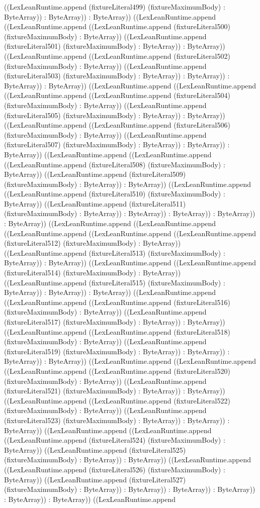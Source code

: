\documentclass[11pt]{article}
\begin{document}
((LexLeanRuntime.append (fixtureLiteral499) (fixtureMaximumBody) : ByteArray)) : ByteArray)) : ByteArray)) ((LexLeanRuntime.append ((LexLeanRuntime.append ((LexLeanRuntime.append (fixtureLiteral500) (fixtureMaximumBody) : ByteArray)) ((LexLeanRuntime.append (fixtureLiteral501) (fixtureMaximumBody) : ByteArray)) : ByteArray)) ((LexLeanRuntime.append ((LexLeanRuntime.append (fixtureLiteral502) (fixtureMaximumBody) : ByteArray)) ((LexLeanRuntime.append (fixtureLiteral503) (fixtureMaximumBody) : ByteArray)) : ByteArray)) : ByteArray)) : ByteArray)) ((LexLeanRuntime.append ((LexLeanRuntime.append ((LexLeanRuntime.append ((LexLeanRuntime.append (fixtureLiteral504) (fixtureMaximumBody) : ByteArray)) ((LexLeanRuntime.append (fixtureLiteral505) (fixtureMaximumBody) : ByteArray)) : ByteArray)) ((LexLeanRuntime.append ((LexLeanRuntime.append (fixtureLiteral506) (fixtureMaximumBody) : ByteArray)) ((LexLeanRuntime.append (fixtureLiteral507) (fixtureMaximumBody) : ByteArray)) : ByteArray)) : ByteArray)) ((LexLeanRuntime.append ((LexLeanRuntime.append ((LexLeanRuntime.append (fixtureLiteral508) (fixtureMaximumBody) : ByteArray)) ((LexLeanRuntime.append (fixtureLiteral509) (fixtureMaximumBody) : ByteArray)) : ByteArray)) ((LexLeanRuntime.append ((LexLeanRuntime.append (fixtureLiteral510) (fixtureMaximumBody) : ByteArray)) ((LexLeanRuntime.append (fixtureLiteral511) (fixtureMaximumBody) : ByteArray)) : ByteArray)) : ByteArray)) : ByteArray)) : ByteArray)) ((LexLeanRuntime.append ((LexLeanRuntime.append ((LexLeanRuntime.append ((LexLeanRuntime.append ((LexLeanRuntime.append (fixtureLiteral512) (fixtureMaximumBody) : ByteArray)) ((LexLeanRuntime.append (fixtureLiteral513) (fixtureMaximumBody) : ByteArray)) : ByteArray)) ((LexLeanRuntime.append ((LexLeanRuntime.append (fixtureLiteral514) (fixtureMaximumBody) : ByteArray)) ((LexLeanRuntime.append (fixtureLiteral515) (fixtureMaximumBody) : ByteArray)) : ByteArray)) : ByteArray)) ((LexLeanRuntime.append ((LexLeanRuntime.append ((LexLeanRuntime.append (fixtureLiteral516) (fixtureMaximumBody) : ByteArray)) ((LexLeanRuntime.append (fixtureLiteral517) (fixtureMaximumBody) : ByteArray)) : ByteArray)) ((LexLeanRuntime.append ((LexLeanRuntime.append (fixtureLiteral518) (fixtureMaximumBody) : ByteArray)) ((LexLeanRuntime.append (fixtureLiteral519) (fixtureMaximumBody) : ByteArray)) : ByteArray)) : ByteArray)) : ByteArray)) ((LexLeanRuntime.append ((LexLeanRuntime.append ((LexLeanRuntime.append ((LexLeanRuntime.append (fixtureLiteral520) (fixtureMaximumBody) : ByteArray)) ((LexLeanRuntime.append (fixtureLiteral521) (fixtureMaximumBody) : ByteArray)) : ByteArray)) ((LexLeanRuntime.append ((LexLeanRuntime.append (fixtureLiteral522) (fixtureMaximumBody) : ByteArray)) ((LexLeanRuntime.append (fixtureLiteral523) (fixtureMaximumBody) : ByteArray)) : ByteArray)) : ByteArray)) ((LexLeanRuntime.append ((LexLeanRuntime.append ((LexLeanRuntime.append (fixtureLiteral524) (fixtureMaximumBody) : ByteArray)) ((LexLeanRuntime.append (fixtureLiteral525) (fixtureMaximumBody) : ByteArray)) : ByteArray)) ((LexLeanRuntime.append ((LexLeanRuntime.append (fixtureLiteral526) (fixtureMaximumBody) : ByteArray)) ((LexLeanRuntime.append (fixtureLiteral527) (fixtureMaximumBody) : ByteArray)) : ByteArray)) : ByteArray)) : ByteArray)) : ByteArray)) : ByteArray)) ((LexLeanRuntime.append 
\end{document}
